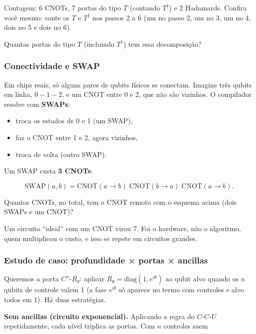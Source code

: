 Contagem: 6 CNOTs, 7 portas do tipo \(T\) (contando \(T^\dagger\)) e 2 Hadamards. Confira você mesmo: conte os \(T\) e \(T^\dagger\) nos passos 2 a 6 (um no passo 2, um no 3, um no 4, dois no 5 e dois no 6).

Quantas portas do tipo \(T\) (incluindo \(T^\dagger\)) tem essa decomposição?

\subsubsection{Conectividade e SWAP}\label{conectividade-e-swap}

Em chips reais, só alguns pares de qubits físicos se conectam. Imagine três qubits em linha, \(0 - 1 - 2\), e um CNOT entre 0 e 2, que não são vizinhos. O compilador resolve com \textbf{SWAPs}:

\begin{itemize}
\tightlist
\item
  troca os estados de 0 e 1 (um SWAP),
\item
  faz o CNOT entre 1 e 2, agora vizinhos,
\item
  troca de volta (outro SWAP).
\end{itemize}

Um SWAP custa \textbf{3 CNOTs}:

\[
\text{SWAP}(a,b) = \text{CNOT}(a\to b)\;\text{CNOT}(b\to a)\;\text{CNOT}(a\to b).
\]

Quantos CNOTs, no total, tem o CNOT remoto com o esquema acima (dois SWAPs e um CNOT)?

Um circuito ``ideal'' com um CNOT virou 7. Foi o hardware, não o algoritmo, quem multiplicou o custo, e isso se repete em circuitos grandes.

\subsubsection{Estudo de caso: profundidade × portas × ancillas}\label{estudo-de-caso-profundidade-portas-ancillas}

Queremos a porta \(C^n\text{-}R_\theta\): aplicar \(R_\theta=\mathrm{diag}(1,e^{i\theta})\) ao qubit alvo quando os \(n\) qubits de controle valem 1 (a fase \(e^{i\theta}\) só aparece no termo com controles e alvo todos em 1). Há duas estratégias.

\textbf{Sem ancillas (circuito exponencial).} Aplicando a regra do \(C\text{-}C\text{-}U\) repetidamente, cada nível triplica as portas. Com \(n\) controles saem

